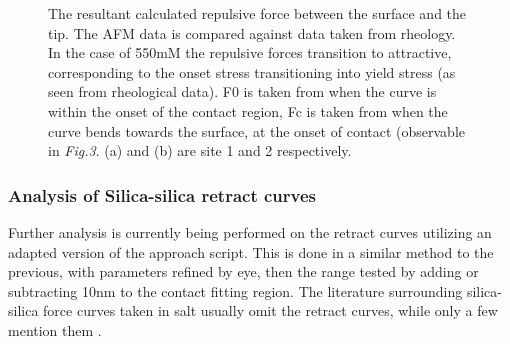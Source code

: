 \begin{figure}[!tbph!!!]
  \centering
  \hfill
  \caption{The resultant calculated repulsive force between the surface and the tip. The AFM data is compared against data taken from rheology. In the case of 550mM the repulsive forces transition to attractive, corresponding to the onset stress transitioning into yield stress (as seen from rheological data). F0 is taken from when the curve is within the onset of the contact region, Fc is taken from when the curve bends towards the surface, at the onset of contact (observable in \textit{Fig.3}. (a) and (b) are site 1 and 2 respectively\cite{John}.}
\end{figure}

\newpage

\subsubsection{Analysis of Silica-silica retract curves}

Further analysis is currently being performed on the retract curves utilizing an adapted version of the approach script. This is done in a similar method to the previous, with parameters refined by eye, then the range tested by adding or subtracting 10nm to the contact fitting region. The literature surrounding silica-silica force curves taken in salt usually omit the retract curves, while only a few mention them \cite{Retrace}. 

